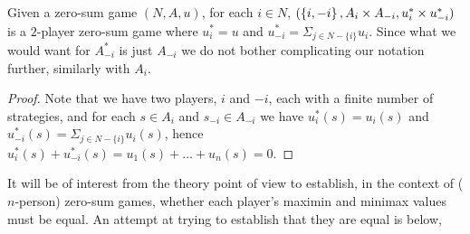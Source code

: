 	\begin{proposition} \label{prop:2pzsminmaxi=-minmaxj}
		Given a zero-sum game $(N, A, u)$, for each $i \in N$, $(\left\{i, -i\right\}, A_i\times{A_{-i}}, u^*_i\times u^*_{-i})$ is a $2$-player zero-sum game where $u^*_i = u$ and $u^*_{-i} = \Sigma_{j \in N-\{i\}}u_i$. Since what we would want for $A^*_{-i}$ is just $A_{-i}$ we do not bother complicating our notation further, similarly with $A_i$. 
		
		\begin{proof}
			Note that we have two players, $i$ and $-i$, each with a finite number of strategies, and for each $s \in A_i$ and $s_{-i} \in A_{-i}$ we have $u^*_i(s) = u_i(s)$ and $u^*_{-i}(s) = \Sigma_{j \in N-\{i\}} u_i(s)$, hence $u^*_i(s) + u^*_{-i}(s) = u_1(s) + \ldots + u_n(s) = 0$.
		\end{proof}
	\end{proposition}
	
	It will be of interest from the theory point of view to establish, in the context of ($n$-person) zero-sum games, whether each player's maximin and minimax values must be equal. An attempt at trying to establish that they are equal is below, 
	
